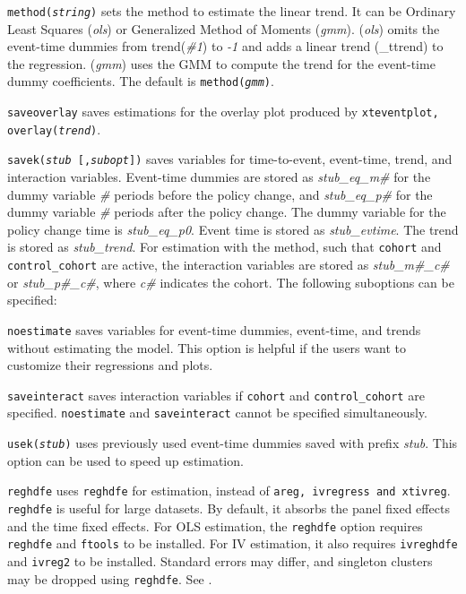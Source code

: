 \documentclass[12pt]{article}
\begin{document}
\morehangpara
{\tt method({\it string})} sets the method to estimate the linear trend. It can be Ordinary Least Squares ({\it ols}) or Generalized Method of Moments ({\it gmm}). ({\it ols}) omits the event-time dummies from trend({\it \#1}) to {\it -1} and adds a linear trend (\_ttrend) to the regression. ({\it gmm}) uses the GMM to compute the trend for the event-time dummy coefficients. The default is {\tt method({\it gmm})}.

\morehangpara
{\tt saveoverlay} saves estimations for the overlay plot produced by
{\tt xteventplot, overlay({\it trend})}.

\hangpara
{\tt savek({\it stub} [,{\it subopt}])} saves variables for time-to-event, event-time, trend, and interaction variables.
Event-time dummies are stored as {\it stub\_eq\_m\#} for the dummy variable {\it \#} periods before the policy change, and {\it stub\_eq\_p\#} for the dummy variable {\it \#} periods after the policy change.
The dummy variable for the policy change time is {\it stub\_eq\_p0}.
Event time is stored as {\it stub\_evtime}. The trend is stored as {\it stub\_trend}.
For estimation with the \citet{sun2021estimating} method, such that {\tt cohort} and {\tt control\_cohort} are active, the interaction variables are stored as {\it stub\_m\#\_c\#} or {\it stub\_p\#\_c\#}, where {\it c\#} indicates the cohort.
The following suboptions can be specified:

\morehangpara
{\tt noestimate} saves variables for event-time dummies, event-time, and trends without estimating the model.
This option is helpful if the users want to customize their regressions and plots.

\morehangpara
{\tt saveinteract} saves interaction variables if {\tt cohort} and {\tt control\_cohort} are specified. {\tt noestimate} and {\tt saveinteract} cannot be specified simultaneously.

\hangpara
{\tt usek({\it stub})} uses previously used event-time dummies saved with prefix {\it stub}.
This option can be used to speed up estimation.

\hangpara
{\tt reghdfe} uses {\tt reghdfe} for estimation, instead of {\tt areg, ivregress and  xtivreg}.
{\tt reghdfe} is useful for large datasets.
By default, it absorbs the panel fixed effects and the time fixed effects.
For OLS estimation, the {\tt reghdfe} option requires {\tt reghdfe} and {\tt ftools} to be installed. For IV estimation, it also requires {\tt ivreghdfe} and {\tt ivreg2} to be installed.
Standard errors may differ, and singleton clusters may be dropped using {\tt reghdfe}.
See \citet{Correia2017:HDFE}.
\end{document}
